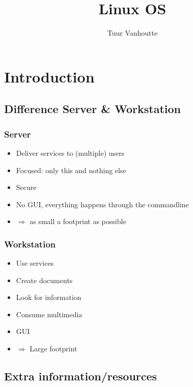 \documentclass{article}
\begin{document}
\begin{titlepage}
    \author{Tuur Vanhoutte}
    \title{Linux OS}
\end{titlepage}

\maketitle
\newpage
\tableofcontents
\newpage


\section{Introduction}

\subsection{Difference Server \& Workstation}

\subsubsection{Server}

\begin{itemize}
    \item Deliver services to (multiple) users
    \item Focused: only this and nothing else
    \item Secure
    \item No GUI, everything happens through the commandline
    \item $\Rightarrow$ as small a footprint as possible
\end{itemize}

\subsubsection{Workstation}

\begin{itemize}
    \item Use services
    \item Create documents
    \item Look for information
    \item Consume multimedia
    \item GUI
    \item $\Rightarrow$ Large footprint
\end{itemize}

\subsection{Extra information/resources}
\end{document}
